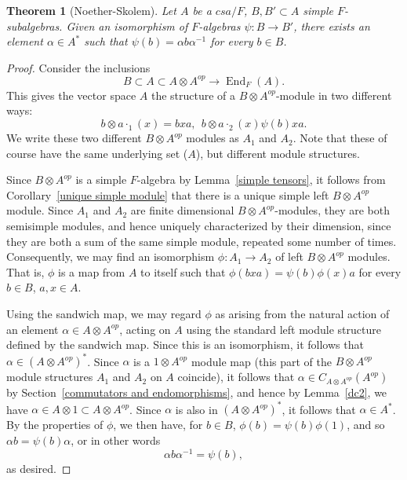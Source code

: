 \documentclass[12pt]{report}
\theoremstyle{plain}
\newtheorem{thm}{Theorem}[section]
\newcommand{\oper}[1]{\operatorname{#1}}
\newcommand{\End}{\oper{End}}
\begin{document}
\begin{thm}[Noether-Skolem]
Let $A$ be a $csa/F$, $B, B' \subset A$ simple $F$-subalgebras. Given an
isomorphism of $F$-algebras $\psi: B \to B'$, there exists an element $\alpha
\in A^*$ such that $\psi(b) = \alpha b \alpha^{-1}$ for every $b \in B$.
\end{thm}
\begin{proof}
Consider the inclusions
\[B \subset A \subset A \otimes A^{op} \to \End_F(A).\]
This gives the vector space $A$ the structure of a $B \otimes
A^{op}$-module in two different ways:
\[b \otimes a \cdot_1 (x) = bxa,  \ \ b \otimes a \cdot_2 (x) \psi(b) x
a.\]
We write these two different $B \otimes A^{op}$ modules as $A_1$ and $A_2$.
Note that these of course have the same underlying set ($A$), but different
module structures.

Since $B \otimes A^{op}$ is a simple $F$-algebra by Lemma~\ref{simple
tensors}, it follows from Corollary~\ref{unique simple module} that there
is a unique simple left $B \otimes A^{op}$ module. Since $A_1$ and $A_2$
are finite dimensional $B \otimes A^{op}$-modules, they are both semisimple
modules, and hence uniquely characterized by their dimension, since they
are both a sum of the same simple module, repeated some number of times.
Consequently, we may find an isomorphism $\phi: A_1 \to A_2$ of left $B
\otimes A^{op}$ modules. That is, $\phi$ is a map from $A$ to itself such
that $\phi(b x a) = \psi(b)\phi(x) a$ for every $b \in B$, $a, x \in A$.

Using the sandwich map, we may regard $\phi$ as
arising from the natural action of an element $\alpha \in A \otimes
A^{op}$, acting on $A$ using the standard left module structure defined by
the sandwich map. Since this is an isomorphism, it follows that $\alpha \in
(A \otimes A^{op})^*$. Since $\alpha$ is a $1 \otimes A^{op}$ module map
(this part of the $B \otimes A^{op}$ module structures $A_1$ and $A_2$ on
$A$ coincide), it follows that $\alpha \in C_{A \otimes A^{op}}(A^{op})$ by
Section~\ref{commutators and endomorphisms}, and hence by Lemma~\ref{dc2},
we have $\alpha \in A \otimes 1 \subset A \otimes A^{op}$. Since $\alpha$
is also in $(A \otimes A^{op})^*$, it follows that $\alpha \in A^*$. By
the properties of $\phi$, we then have, for $b \in B$, $\phi(b) = \psi(b)
\phi(1)$, and so $\alpha b = \psi(b) \alpha$, or in other words
\[\alpha b \alpha^{-1} = \psi(b),\]
as desired.
\end{proof}

\iffalse
\end{document}
